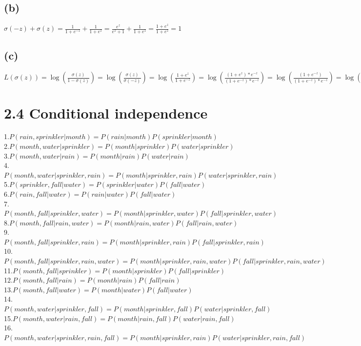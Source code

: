 \documentclass [11pt, a4paper, oneside] {article}
\begin{document}
\subsection *{(b)}
$\sigma(-z) + \sigma(z) = \frac{1}{1+e^{-z}} + \frac{1}{1+e^{z}} = \frac{e^z}{e^z+1} + \frac{1}{1+e^{z}} = \frac{1+e^{z}}{1+e^{z}} = 1$\\
\subsection *{(c)}
$L(\sigma(z)) = \log(\frac{\sigma(z)}{1-\sigma(z)}) = \log(\frac{\sigma(z)}{\sigma(-z)}) = \log(\frac{1+e^z}{1+e^{-z}}) = \log(\frac{(1+e^z)*e^{-z}}{(1+e^{-z})*e^{-z}}) = \log(\frac{(1+e^{-z})}{(1+e^{-z})*e^{-z}}) = \log(\frac{1}{e^{-z}})= \log(e^z) = z$
\section *{2.4 Conditional independence}
1.$P(rain, sprinkler|month) = P(rain|month)P(sprinkler|month)$\\
2.$P(month, water|sprinkler) = P(month|sprinkler)P(water|sprinkler)$\\
3.$P(month, water|rain) = P(month|rain)P(water|rain)$\\
4.$P(month, water|sprinkler, rain) = P(month|sprinkler, rain)P(water|sprinkler, rain)$\\
5.$P(sprinkler, fall|water) = P(sprinkler|water)P(fall|water)$\\
6.$P(rain, fall|water) = P(rain|water)P(fall|water)$\\
7.$P(month, fall|sprinkler, water) = P(month|sprinkler, water)P(fall|sprinkler, water)$\\
8.$P(month, fall|rain, water) = P(month|rain, water)P(fall|rain, water)$\\
9.$P(month, fall|sprinkler, rain) = P(month|sprinkler, rain)P(fall|sprinkler, rain)$\\
10.$P(month, fall|sprinkler, rain, water) = P(month|sprinkler, rain, water)P(fall|sprinkler, rain, water)$\\
11.$P(month, fall|sprinkler) = P(month|sprinkler)P(fall|sprinkler)$\\
12.$P(month, fall|rain) = P(month|rain)P(fall|rain)$\\
13.$P(month, fall|water) = P(month|water)P(fall|water)$\\
14.$P(month, water|sprinkler, fall) = P(month|sprinkler, fall)P(water|sprinkler, fall)$\\
15.$P(month, water|rain, fall) = P(month|rain, fall)P(water|rain, fall)$\\
16.$P(month, water|sprinkler, rain, fall) = P(month|sprinkler, rain)P(water|sprinkler, rain, fall)$\\
\end{document}

